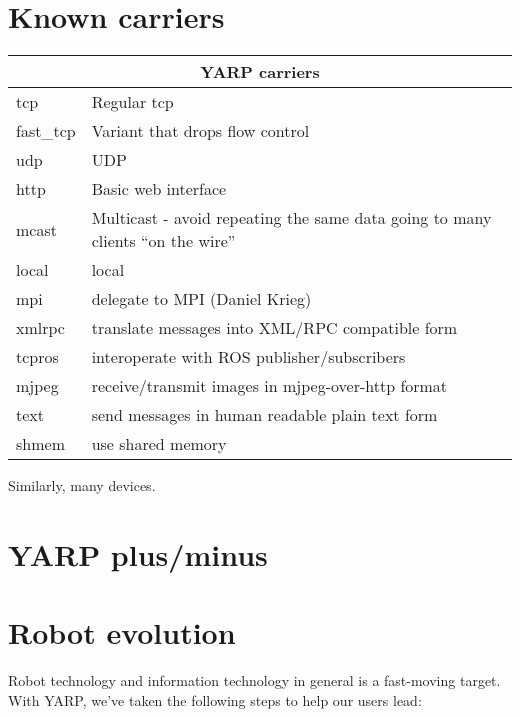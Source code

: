 \clearpage
\newpage


\section{Known carriers}



\begin{tabular}{|l|p{7cm}|}
\hline
\multicolumn{2}{|c|}{YARP carriers} \\
\hline
tcp & Regular tcp \\
fast\_tcp & Variant that drops flow control \\
udp & UDP \\
http & Basic web interface \\
mcast & Multicast - avoid repeating the same data going
to many clients ``on the wire''  \\
local & local \\
mpi & delegate to MPI (Daniel Krieg) \\
xmlrpc & translate messages into XML/RPC compatible form \\
tcpros & interoperate with ROS publisher/subscribers \\
mjpeg & receive/transmit images in mjpeg-over-http format \\
text & send messages in human readable plain text form \\
shmem & use shared memory \\
\hline
\end{tabular}

Similarly, many devices.


\section{YARP plus/minus}


\section{Robot evolution}

Robot technology and information technology in general is a
fast-moving target.  With YARP, we've taken the following steps to
help our users lead:

